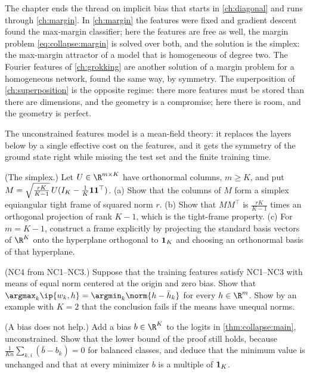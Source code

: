 \begin{refsection}
The chapter ends the thread on implicit bias that starts in \cref{ch:diagonal} and runs through \cref{ch:margin}. In \cref{ch:margin} the features were fixed and gradient descent found the max-margin classifier; here the features are free as well, the margin problem \eqref{eq:collapse:margin} is solved over both, and the solution is the simplex: the max-margin attractor of a model that is homogeneous of degree two. The Fourier features of \cref{ch:grokking} are another solution of a margin problem for a homogeneous network, found the same way, by symmetry. The superposition of \cref{ch:superposition} is the opposite regime: there more features must be stored than there are dimensions, and the geometry is a compromise; here there is room, and the geometry is perfect.

The unconstrained features model is a mean-field theory: it replaces the layers below by a single effective cost on the features, and it gets the symmetry of the ground state right while missing the test set and the finite training time.

\begin{exercises}
\item \consolidation (The simplex.) Let $U\in\R^{m\times K}$ have orthonormal columns, $m\ge K$, and put $M=\sqrt{\frac{rK}{K-1}}\,U(I_K-\frac1K\mathbf 1\mathbf 1^\top)$. (a) Show that the columns of $M$ form a simplex equiangular tight frame of squared norm $r$. (b) Show that $MM^\top$ is $\frac{rK}{K-1}$ times an orthogonal projection of rank $K-1$, which is the tight-frame property. (c) For $m=K-1$, construct a frame explicitly by projecting the standard basis vectors of $\R^K$ onto the hyperplane orthogonal to $\mathbf 1_K$ and choosing an orthonormal basis of that hyperplane. \label{ex:collapse:etf}

\item \consolidation (NC4 from NC1--NC3.) Suppose that the training features satisfy NC1--NC3 with means of equal norm centered at the origin and zero bias. Show that $\argmax_k\ip{w_k,h}=\argmin_k\norm{h-\bar h_k}$ for every $h\in\R^m$. Show by an example with $K=2$ that the conclusion fails if the means have unequal norms. \label{ex:collapse:ncc}

\item \consolidation (A bias does not help.) Add a bias $b\in\R^K$ to the logits in \cref{thm:collapse:main}, unconstrained. Show that the lower bound of the proof still holds, because $\frac1{Kn}\sum_{k,i}(\bar b-b_k)=0$ for balanced classes, and deduce that the minimum value is unchanged and that at every minimizer $b$ is a multiple of $\mathbf 1_K$. \label{ex:collapse:bias}


\end{exercises}
\end{refsection}
